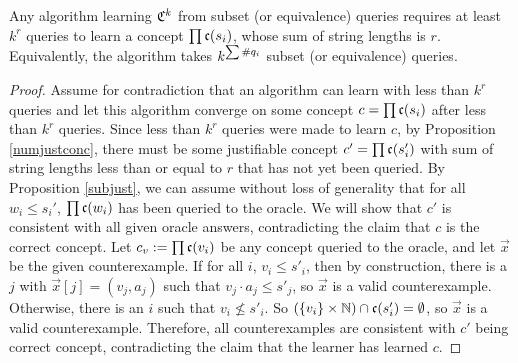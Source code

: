 \begin{theorem}
Any algorithm learning $\mathfrak{C}^k$ from subset (or equivalence) queries requires at least $k^r$ queries to learn a concept $\prod \mathfrak{c}(s_i)$, whose sum of string lengths is $r$.
Equivalently, the algorithm takes $k^{\sum \#q_{i}}$ subset (or equivalence) queries.
\end{theorem}
\begin{proof}
Assume for contradiction that an algorithm can learn with less than $k^r$ queries and let this algorithm converge on some concept $c = \prod \mathfrak{c}(s_i)$ after less than $k^r$ queries.
Since less than $k^r$ queries were made to learn $c$, by Proposition \ref{numjustconc}, there must be some justifiable concept $c' = \prod \mathfrak{c}(s'_i)$ with sum of string lengths less than or equal to $r$ that has not yet been queried.
By Proposition \ref{subjust}, we can assume without loss of generality that for all $w_i \le s_i'$, $\prod \mathfrak{c}(w_i)$ has been queried to the oracle.
We will show that $c'$ is consistent with all given oracle answers, contradicting the claim that $c$ is the correct concept. 
Let $c_v := \prod \mathfrak{c}(v_i)$ be any concept queried to the oracle, and let $\vec{x}$ be the given counterexample.
If for all $i$, $v_i \le s'_i$, then by construction, there is a $j$ with $\vec{x}[j] = (v_j, a_j)$ such that $v_j \cdot a_j \le s'_j$, so $\vec{x}$ is a valid counterexample.
Otherwise, there is an $i$ such that $v_i \not\le s'_i$. 
So $(\{v_i\} \times \mathbb{N})  \cap \mathfrak{c}(s'_i) = \emptyset$, so $\vec{x}$ is a valid counterexample. 
Therefore, all counterexamples are consistent with $c'$ being correct concept, contradicting the claim that the learner has learned $c$. 
\end{proof}







